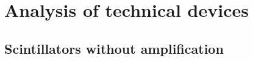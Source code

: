 \section{Analysis of technical devices}
\subsection{Scintillators without amplification}

\newpage

